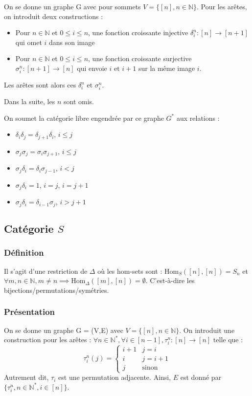 \documentclass{article}
\theoremstyle{definition}
\theoremstyle{definition}
\theoremstyle{remark}
\begin{document}
On se donne un graphe G avec pour sommets $V = \{[n], n\in\mathbb N\}$.
Pour les arêtes, on introduit deux constructions :
\begin{itemize}
    \item Pour $n \in \mathbb N$ et $0 \leq i \leq n$, une fonction croissante injective $\delta_i^n:[n] \to[n+1]$ qui omet $i$ dans son image
    \item Pour $n \in \mathbb N$ et $0 \leq i \leq n$, une fonction croissante surjective $\sigma_i^n:[n+1]\to[n]$ qui envoie $i$ et $i+1$ sur la même image $i$.
\end{itemize}
Les arêtes sont alors ces $\delta_i^n$ et $\sigma_i^n$.

Dans la suite, les $n$ sont omis.

On soumet la catégorie libre engendrée par ce graphe $G^*$ aux relations :
\begin{itemize}
    \item $\delta_i\delta_j=\delta_{j+1}\delta_i$, $i \leq j$
    \item $\sigma_j\sigma_j=\sigma_i\sigma_{j+1}$, $i \leq j$
    \item $\sigma_j\delta_i=\delta_i\sigma_{j-1}$, $i < j$
    \item $\sigma_j\delta_i=1$, $i=j$, $i=j+1$
    \item $\sigma_j\delta_i=\delta_{i-1}\sigma_j$, $i>j+1$
\end{itemize}


\subsection{Catégorie $S$}
\subsubsection{Définition}
Il s'agit d'une restriction de $\Delta$ où les hom-sets sont : $\text{Hom}_S([n],[n])=S_n$ et $\forall m,n\in\mathbb N, m\neq n \implies \text{Hom}_\Delta([m], [n]) = \emptyset$. C'est-à-dire les bijections/permutations/symétries.
\subsubsection{Présentation}
On se donne un graphe G = (V,E) avec $V = \{[n], n\in\mathbb N\}$.
On introduit une construction pour les arêtes : $\forall n \in \mathbb N^*, \forall i \in [n-1], \tau_i^n:[n]\to[n]$ telle que :
\begin{equation}
   \tau_i^n(j) =
    \begin{cases}
      i+1 & j = i \\
      i & j = i +1 \\
      j & \text{sinon}
    \end{cases}       
\end{equation}
Autrement dit, $\tau_i$ est une permutation adjacente.
Ainsi, $E$ est donné par $\{\tau_i^n, n \in \mathbb N^*, i\in[n]\}$.
\end{document}
